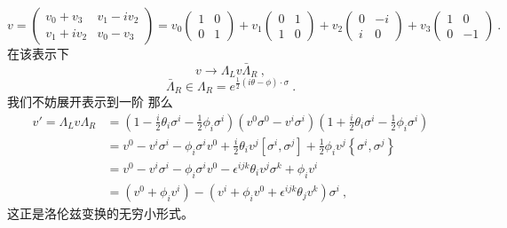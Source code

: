 \begin{equation}
v=\left(\begin{array}{cc}
v_{0}+v_{3} & v_{1}-i v_{2} \\
v_{1}+i v_{2} & v_{0}-v_{3}
\end{array}\right)=v_{0}\left(\begin{array}{cc}
1 & 0 \\
0 & 1
\end{array}\right)+v_{1}\left(\begin{array}{cc}
0 & 1 \\
1 & 0
\end{array}\right)+v_{2}\left(\begin{array}{cc}
0 & -i \\
i & 0
\end{array}\right)+v_{3}\left(\begin{array}{cc}
1 & 0 \\
0 & -1
\end{array}\right)~.
\end{equation}
在该表示下
\begin{equation}
v\rightarrow\Lambda_{L}v \bar{\Lambda}_{R}~,
\end{equation}
\begin{equation}
\bar{\Lambda}_{R}\in\Lambda_{R}=e^{\frac{1}{2}(i \theta-\phi) \cdot \sigma}~.
\end{equation}
我们不妨展开表示到一阶
那么
\begin{equation}
\begin{aligned}
v'=\Lambda_{L} v \Lambda_{R} &=\left(1-\frac{i}{2} \theta_{i} \sigma^{i}-\frac{1}{2} \phi_{i} \sigma^{i}\right)\left(v^{0}\sigma^0-v^{i} \sigma^{i}\right)\left(1+\frac{i}{2} \theta_{i} \sigma^{i}-\frac{1}{2} \phi_{i} \sigma^{i}\right) \\
&=v^{0}-v^{i} \sigma^{i}-\phi_{i} \sigma^{i} v^{0}+\frac{i}{2} \theta_{i} v^{j}\left[\sigma^{i}, \sigma^{j}\right]+\frac{1}{2} \phi_{i} v^{j}\left\{\sigma^{i}, \sigma^{j}\right\} \\
&=v^{0}-v^{i} \sigma^{i}-\phi_{i} \sigma^{i} v^{0}-\epsilon^{i j k} \theta_{i} v^{j} \sigma^{k}+\phi_{i} v^{i} \\
&=\left(v^{0}+\phi_{i} v^{i}\right)-\left(v^{i}+\phi_{i} v^{0}+\epsilon^{i j k} \theta_{j} v^{k}\right) \sigma^{i}~,
\end{aligned}
\end{equation}
这正是洛伦兹变换的无穷小形式。
